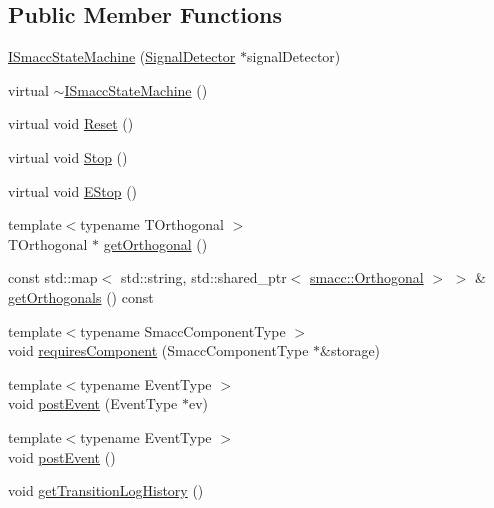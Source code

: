 \subsection*{Public Member Functions}
\begin{DoxyCompactItemize}
\item 
\hyperlink{classsmacc_1_1ISmaccStateMachine_a497c2185584adbec3298d4000277b75e}{I\+Smacc\+State\+Machine} (\hyperlink{classsmacc_1_1SignalDetector}{Signal\+Detector} $\ast$signal\+Detector)
\item 
virtual \hyperlink{classsmacc_1_1ISmaccStateMachine_a54bb9bac0008d3efc6a50cce88dce48e}{$\sim$\+I\+Smacc\+State\+Machine} ()
\item 
virtual void \hyperlink{classsmacc_1_1ISmaccStateMachine_ae175edef7aba48a1ac82e8401632c5fa}{Reset} ()
\item 
virtual void \hyperlink{classsmacc_1_1ISmaccStateMachine_a8f353fcf0686b1dacb57458da882c89b}{Stop} ()
\item 
virtual void \hyperlink{classsmacc_1_1ISmaccStateMachine_a3c5aab001d1bb7edcb37413404e4a7c2}{E\+Stop} ()
\item 
{\footnotesize template$<$typename T\+Orthogonal $>$ }\\T\+Orthogonal $\ast$ \hyperlink{classsmacc_1_1ISmaccStateMachine_a38b8b6e3d65b7de33020c9c397cf29bb}{get\+Orthogonal} ()
\item 
const std\+::map$<$ std\+::string, std\+::shared\+\_\+ptr$<$ \hyperlink{classsmacc_1_1Orthogonal}{smacc\+::\+Orthogonal} $>$ $>$ \& \hyperlink{classsmacc_1_1ISmaccStateMachine_a262b3f2d15af019190fa69b7c0df00f8}{get\+Orthogonals} () const 
\item 
{\footnotesize template$<$typename Smacc\+Component\+Type $>$ }\\void \hyperlink{classsmacc_1_1ISmaccStateMachine_aa6b25e28f3bce24c4b356dc865a9eb7b}{requires\+Component} (Smacc\+Component\+Type $\ast$\&storage)
\item 
{\footnotesize template$<$typename Event\+Type $>$ }\\void \hyperlink{classsmacc_1_1ISmaccStateMachine_ad80cdd7bbc9a9f3b221c625754fed1ed}{post\+Event} (Event\+Type $\ast$ev)
\item 
{\footnotesize template$<$typename Event\+Type $>$ }\\void \hyperlink{classsmacc_1_1ISmaccStateMachine_a1549189caf29520514e677ca46f57348}{post\+Event} ()
\item 
void \hyperlink{classsmacc_1_1ISmaccStateMachine_ae7c08fc2addf8ee4785f721050e6a763}{get\+Transition\+Log\+History} ()

\end{DoxyCompactItemize}
